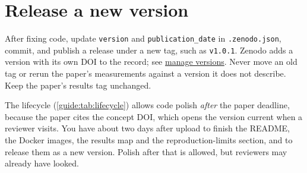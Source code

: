 \section{Release a new version}\label{guide:zenodo:versions}
After fixing code, update \texttt{version} and \texttt{publication\_date} in \texttt{.zenodo.json}, commit, and publish a release under a new tag, such as \texttt{v1.0.1}. Zenodo adds a version with its own DOI to the record; see \href{https://help.zenodo.org/docs/deposit/manage-versions/}{manage versions}. Never move an old tag or rerun the paper's measurements against a version it does not describe. Keep the paper's results tag unchanged.

The lifecycle (\cref{guide:tab:lifecycle}) allows code polish \emph{after} the paper deadline, because the paper cites the concept DOI, which opens the version current when a reviewer visits. You have about two days after upload to finish the README, the Docker images, the results map and the reproduction-limits section, and to release them as a new version. Polish after that is allowed, but reviewers may already have looked.
